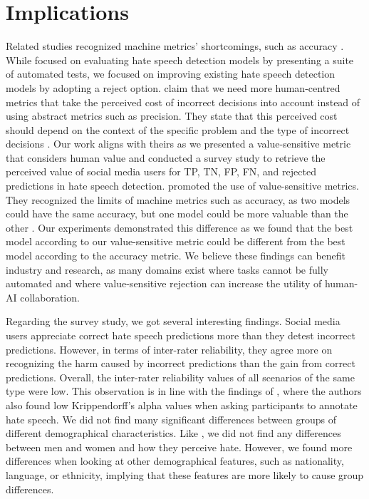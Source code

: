 \section{Implications}
Related studies recognized machine metrics' shortcomings, such as accuracy \citep{casati2021value,olteanu2017limits,rottger2020hatecheck}.
%
%
While \citet{rottger2020hatecheck} focused on evaluating hate speech detection models by presenting a suite of automated tests, we focused on improving existing hate speech detection models by adopting a reject option.
%
\citet{olteanu2017limits} claim that we need more human-centred metrics that take the perceived cost of incorrect decisions into account instead of using abstract metrics such as precision.
%
They state that this perceived cost should depend on the context of the specific problem and the type of incorrect decisions \citep{olteanu2017limits}.
%
Our work aligns with theirs as we presented a value-sensitive metric that considers human value and conducted a survey study to retrieve the perceived value of social media users for TP, TN, FP, FN, and rejected predictions in hate speech detection.
%
%
\citet{casati2021value} promoted the use of value-sensitive metrics.
%
They recognized the limits of machine metrics such as accuracy, as two models could have the same accuracy, but one model could be more valuable than the other \citep{casati2021value}.
%
Our experiments demonstrated this difference as we found that the best model according to our value-sensitive metric could be different from the best model according to the accuracy metric.
%
We believe these findings can benefit industry and research, as many domains exist where tasks cannot be fully automated and where value-sensitive rejection can increase the utility of human-AI collaboration.
%

%
Regarding the survey study, we got several interesting findings.
%
Social media users appreciate correct hate speech predictions more than they detest incorrect predictions.
%
However, in terms of inter-rater reliability, they agree more on recognizing the harm caused by incorrect predictions than the gain from correct predictions.
%
Overall, the inter-rater reliability values of all scenarios of the same type were low.
%
This observation is in line with the findings of \citet{ross2017measuring}, where the authors also found low Krippendorff's alpha values when asking participants to annotate hate speech.
%
We did not find many significant differences between groups of different demographical characteristics.
%
Like \citet{gold2018women}, we did not find any differences between men and women and how they perceive hate.
%
However, we found more differences when looking at other demographical features, such as nationality, language, or ethnicity, implying that these features are more likely to cause group differences.
%

